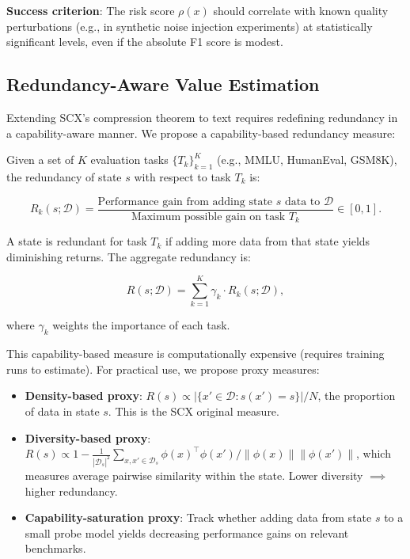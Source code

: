 \documentclass[11pt,twocolumn]{article}
\begin{document}
\textbf{Success criterion}: The risk score $\rho(x)$ should correlate with known quality perturbations (e.g., in synthetic noise injection experiments) at statistically significant levels, even if the absolute F1 score is modest.

\subsection{Redundancy-Aware Value Estimation}
\label{sec:redundancy}

Extending SCX's compression theorem to text requires redefining redundancy in a capability-aware manner. We propose a capability-based redundancy measure:

Given a set of $K$ evaluation tasks $\{T_k\}_{k=1}^K$ (e.g., MMLU, HumanEval, GSM8K), the redundancy of state $s$ with respect to task $T_k$ is:

\begin{equation}
R_k(s; \mathcal{D}) = \frac{\text{Performance gain from adding state $s$ data to $\mathcal{D}$}}{\text{Maximum possible gain on task $T_k$}} \in [0, 1].
\label{eq:capability_redundancy}
\end{equation}

A state is redundant for task $T_k$ if adding more data from that state yields diminishing returns. The aggregate redundancy is:

\begin{equation}
R(s; \mathcal{D}) = \sum_{k=1}^K \gamma_k \cdot R_k(s; \mathcal{D}),
\label{eq:aggregate_redundancy}
\end{equation}

where $\gamma_k$ weights the importance of each task.

This capability-based measure is computationally expensive (requires training runs to estimate). For practical use, we propose proxy measures:
\begin{itemize}
    \item \textbf{Density-based proxy}: $R(s) \propto |\{x' \in \mathcal{D}: s(x') = s\}| / N$, the proportion of data in state $s$. This is the SCX original measure.
    \item \textbf{Diversity-based proxy}: $R(s) \propto 1 - \frac{1}{|\mathcal{D}_s|^2} \sum_{x,x' \in \mathcal{D}_s} \phi(x)^\top \phi(x') / \|\phi(x)\|\|\phi(x')\|$, which measures average pairwise similarity within the state. Lower diversity $\implies$ higher redundancy.
    \item \textbf{Capability-saturation proxy}: Track whether adding data from state $s$ to a small probe model yields decreasing performance gains on relevant benchmarks.
\end{itemize}
\end{document}
